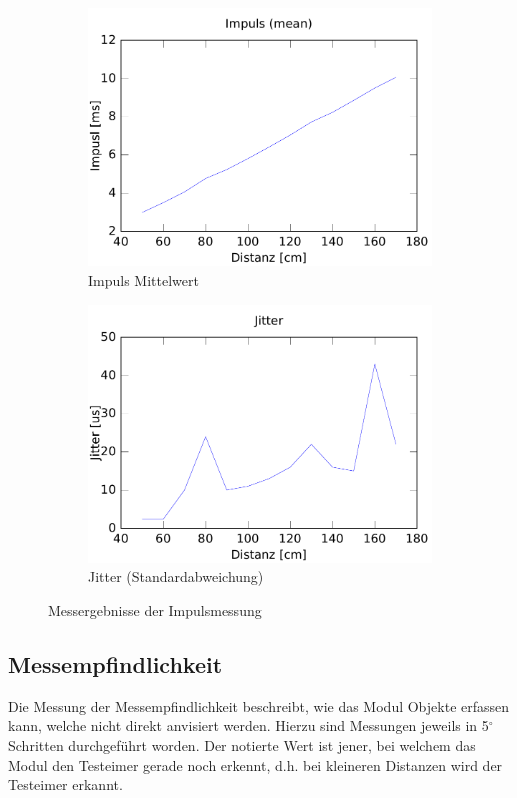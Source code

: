 \begin{figure}[h!]
	\centering
	\begin{subfigure}[b]{0.45\textwidth}
		\includegraphics[width=\textwidth]{../../fig/hc-sr04_accuracy.pdf}
		\caption{Impuls Mittelwert}
		\label{fig:impuls_mean}
	\end{subfigure}
	\begin{subfigure}[b]{0.45\textwidth}
		\includegraphics[width=\textwidth]{../../fig/hc-sr04_jitter.pdf}
		\caption{Jitter (Standardabweichung)}
	\end{subfigure}
	\caption{Messergebnisse der Impulsmessung}
\end{figure}

\subsection{Messempfindlichkeit}
Die Messung der Messempfindlichkeit beschreibt, wie das Modul Objekte erfassen
kann, welche nicht direkt anvisiert werden. Hierzu sind Messungen jeweils in 
5$^\circ$ Schritten durchgeführt worden. Der notierte Wert ist jener, bei
welchem das Modul den Testeimer gerade noch erkennt, d.h. bei kleineren
Distanzen wird der Testeimer erkannt.

